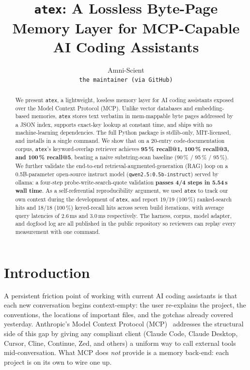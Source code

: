 \documentclass[10pt,letterpaper]{article}
\title{\texttt{atex}: A Lossless Byte-Page Memory Layer for MCP-Capable AI Coding Assistants}
\author{Amni-Scient\\\texttt{the maintainer (via GitHub)}}
\date{}
\begin{document}
\maketitle
\begin{abstract}
We present \texttt{atex}, a lightweight, lossless memory layer for AI coding assistants exposed over the Model Context Protocol (MCP). Unlike vector databases and embedding-based memories, \texttt{atex} stores text verbatim in mem-mappable byte pages addressed by a JSON index, supports exact-key lookup at constant time, and ships with no machine-learning dependencies. The full Python package is stdlib-only, MIT-licensed, and installs in a single command. We show that on a 20-entry code-documentation corpus, \texttt{atex}'s keyword-overlap retriever achieves \textbf{95\,\% recall@1, 100\,\% recall@3, and 100\,\% recall@5}, beating a naive substring-scan baseline (90\,\% / 95\,\% / 95\,\%). We further validate the end-to-end retrieval-augmented-generation (RAG) loop on a 0.5B-parameter open-source instruct model (\texttt{qwen2.5:0.5b-instruct}) served by ollama: a four-step probe-write-search-quote validation \textbf{passes 4/4 steps in 5.54\,s wall time}. As a self-referential reproducibility argument, we used \texttt{atex} to track our own context during the development of \texttt{atex}, and report 19/19 (100\,\%) ranked-search hits and 18/18 (100\,\%) keyed-recall hits across seven build iterations, with average query latencies of 2.6\,ms and 3.0\,ms respectively. The harness, corpus, model adapter, and dogfood log are all published in the public repository so reviewers can replay every measurement with one command.
\end{abstract}

\section{Introduction}
\label{sec:intro}

A persistent friction point of working with current AI coding assistants is that each new conversation begins context-empty: the user re-explains the project, the conventions, the locations of important files, and the gotchas already covered yesterday. Anthropic's Model Context Protocol (MCP)~\cite{mcp} addresses the structural side of this gap by giving any compliant client (Claude Code, Claude Desktop, Cursor, Cline, Continue, Zed, and others) a uniform way to call external tools mid-conversation. What MCP does \emph{not} provide is a memory back-end: each project is on its own to wire one up.
\end{document}
